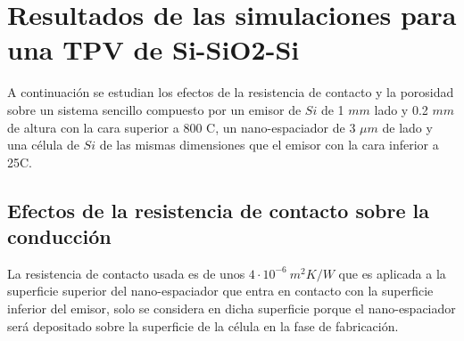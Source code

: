 \section{Resultados de las simulaciones para una TPV de Si-SiO2-Si}
A continuación se estudian los efectos de la resistencia de contacto y la porosidad sobre un sistema sencillo compuesto por un emisor de $Si$ de 1 $mm$ lado y 0.2 $mm$ de altura con la cara superior a 800 \textdegree C, un nano-espaciador de 3 $\mu m$ de lado y una célula de $Si$ de las mismas dimensiones que el emisor con la cara inferior a 25\textdegree C.
\subsection{Efectos de la resistencia de contacto sobre la conducción}
La resistencia de contacto usada es de unos $4\cdot 10^{-6} \ m^2 K/W$ \cite{nf_TPV_Pillars_SiO2} que es aplicada a la superficie superior del nano-espaciador que entra en contacto con la superficie inferior del emisor, solo se considera en dicha superficie porque el nano-espaciador será depositado sobre la superficie de la célula en la fase de fabricación.
